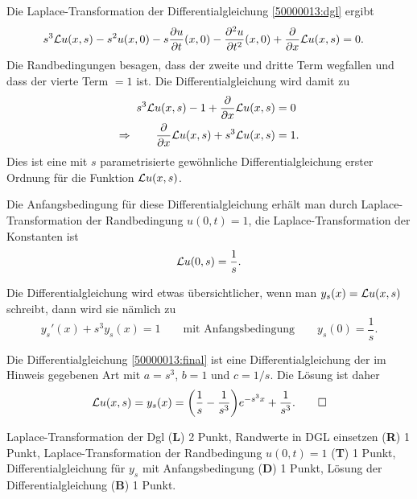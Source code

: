 \begin{loesung}
\begin{teilaufgaben}
\item
Die Laplace-Transformation der Differentialgleichung \eqref{50000013:dgl}
ergibt
\begin{align*}
s^3 {\cal L}u(x,s)
-s^2 u(x,0)
-s\frac{\partial u}{\partial t}(x,0)
-\frac{\partial^2 u}{\partial t^2}(x,0)
+
\frac{\partial}{\partial x}{\cal L}u(x,s)
&=
0.
\end{align*}
Die Randbedingungen besagen, dass der zweite und dritte Term wegfallen
und dass der vierte Term $=1$ ist.
Die Differentialgleichung wird damit zu
\begin{align*}
s^3 {\cal L}u(x,s)
-1
+
\frac{\partial}{\partial x}{\cal L}u(x,s)
&=
0
\\
\Rightarrow\qquad
\frac{\partial}{\partial x}{\cal L}u(x,s)
+
s^3 {\cal L}u(x,s)
&=
1.
\end{align*}
Dies ist eine mit $s$ parametrisierte gewöhnliche Differentialgleichung
erster Ordnung für die Funktion ${\cal L}u(x,s)$.

Die Anfangsbedingung für diese Differentialgleichung erhält man durch
Laplace-Transformation der Randbedingung $u(0,t)=1$, die Laplace-Transformation
der Konstanten ist
\[
{\cal L}u(0,s) = \frac1s.
\]

Die Differentialgleichung wird etwas übersichtlicher, wenn man
$y_s(x) = {\cal L}u(x,s)$ schreibt, dann wird sie nämlich zu
\begin{equation}
y_s'(x) + s^3 y_s(x)=1
\qquad\text{mit Anfangsbedingung}\qquad
y_s(0)=\frac1s.
\label{50000013:final}
\end{equation}

\item
Die Differentialgleichung \eqref{50000013:final} ist eine Differentialgleichung
der im Hinweis gegebenen Art mit $a=s^3$, $b=1$ und $c=1/s$.
Die Lösung ist daher
\[
{\cal L}u(x,s)
=
y_s(x)
=
\biggl(\frac1s-\frac1{s^3}\biggr)e^{-s^3x} + \frac{1}{s^3}.
\qedhere
\]
\end{teilaufgaben}
\end{loesung}

\begin{bewertung}
Laplace-Transformation der Dgl ({\bf L}) 2 Punkt,
Randwerte in DGL einsetzen ({\bf R}) 1 Punkt,
Laplace-Transformation der Randbedingung $u(0,t)=1$ ({\bf T}) 1 Punkt,
Differentialgleichung für $y_s$ mit Anfangsbedingung ({\bf D}) 1 Punkt,
Lösung der Differentialgleichung ({\bf B}) 1 Punkt.
\end{bewertung}
